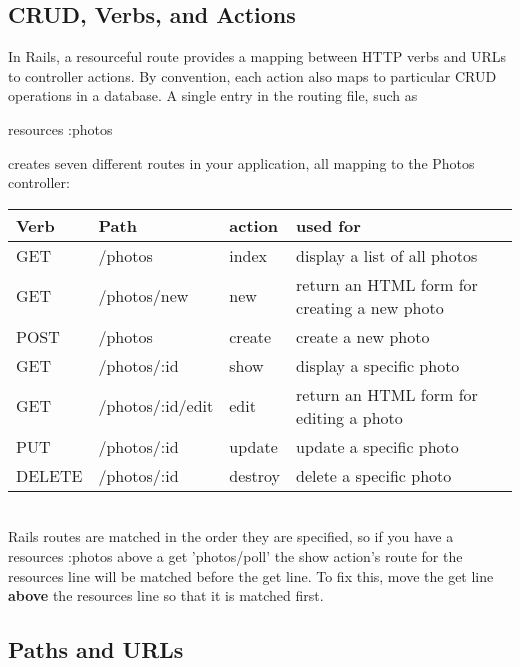 \documentclass[10pt]{book}
\newenvironment{code}{%
  \scriptsize
    \verbatim
}{%
    \endverbatim
    \newline
}
\begin{document}
\subsection{ CRUD, Verbs, and Actions}

In Rails, a resourceful route provides a mapping between HTTP verbs and URLs to controller actions. By convention, each action also maps to particular CRUD operations in a database. A single entry in the routing file, such as
\begin{code}
resources :photos
\end{code}

creates seven different routes in your application, all mapping to the Photos controller:
\\


\noindent
\begin{tabular}{l|p{}|l|p{}}
\hline
\textbf{Verb} & \textbf{Path            } & \textbf{action } & \textbf{used for} \\ 
\hline
GET & /photos            & index     & display a list of all photos                  \\ 
GET & /photos/new        & new       & return an HTML form for creating a new photo  \\ 
POST & /photos            & create    & create a new photo                            \\ 
GET & /photos/:id        & show      & display a specific photo                      \\ 
GET & /photos/:id/edit   & edit      & return an HTML form for editing a photo       \\ 
PUT & /photos/:id        & update    & update a specific photo                       \\ 
DELETE & /photos/:id        & destroy   & delete a specific photo                      
\end{tabular}
\\

Rails routes are matched in the order they are specified, so if you have a resources :photos above a get 'photos/poll' the show action’s route for the resources line will be matched before the get line. To fix this, move the get line \textbf{above} the resources line so that it is matched first.

\subsection{ Paths and URLs}
\end{document}
